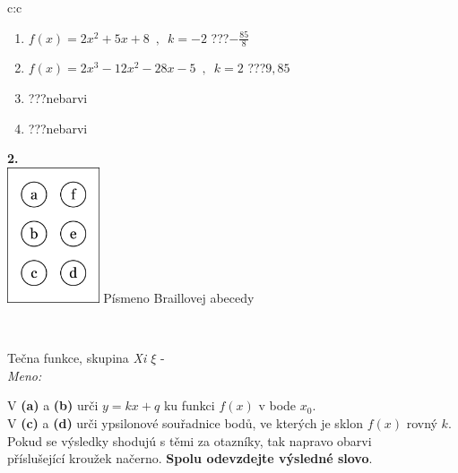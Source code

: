 \documentclass[10pt]{report}
\begin{document}
\begin{tabular}{c:c}
\begin{minipage}[c][104.5mm][t]{0.5\linewidth}
\begin{center}
\begin{minipage}{0.79\linewidth}
\begin{center}
\begin{varwidth}{\linewidth}
\begin{enumerate}
\item $f(x)=2x^2+5x+8\enspace , \enspace k=-2$\quad \dotfill\; ???\;\dotfill \quad $-\frac{85}{8}$
\item $f(x)=2x^3-12x^2-28x-5\enspace , \enspace k=2$\quad \dotfill\; ???\;\dotfill \quad $9 , 85$
\item \quad \dotfill\; ???\;\dotfill \quad nebarvi
\item \quad \dotfill\; ???\;\dotfill \quad nebarvi
\end{enumerate}
\end{varwidth}
\end{center}
\end{minipage}
\begin{minipage}{0.20\linewidth}
\begin{center}
{\Huge\bfseries 2.} \\[2mm]
\includegraphics[height=40mm]{../images/braille.png}
{\small Písmeno Braillovej abecedy}
\end{center}
\end{minipage}
\end{center}
\end{minipage}
\\ \hdashline
\begin{minipage}[c][104.5mm][t]{0.5\linewidth}
\begin{center}
\vspace{7mm}
{\huge Tečna funkce, skupina \textit{Xi $\xi$} -}\\[5mm]
\textit{Meno:}\phantom{xxxxxxxxxxxxxxxxxxxxxxxxxxxxxxxxxxxxxxxxxxxxxxxxxxxxxxxxxxxxxxxxx}\\[5mm]
\begin{minipage}{0.95\linewidth}
\begin{center}
V \textbf{(a)} a \textbf{(b)} urči  $y = kx + q$ ku funkci $f(x)$ v bode $x_0$.\\V \textbf{(c)} a \textbf{(d)} urči ypsilonové souřadnice bodů, ve kterých je sklon $f(x)$ rovný $k$.\\Pokud se výsledky shodujú s těmi za otazníky, tak napravo obarvi\\příslušející kroužek načerno. \textbf{Spolu odevzdejte výsledné slovo}.

\end{center}
\end{minipage}
\end{center}
\end{minipage}
\end{tabular}
\end{document}
